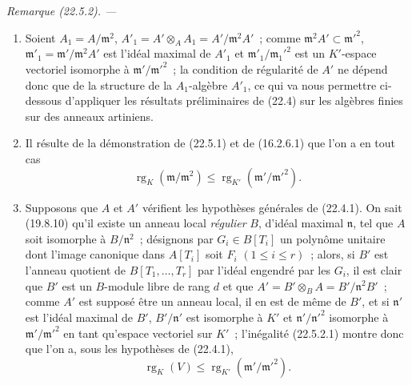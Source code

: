 \documentclass[10pt,oneside]{book}
\makeatletter
\newcommand{\setmanualcurrentlabel}[1]{\def\@currentlabel{#1}}
\newcommand{\oldpage}[2][]{%
  \setcounter{footnote}{0}%
  \marginpar{\scriptsize\textbf{#1}~|~#2}\ignorespaces}
\newenvironment{remark}[1][]{%
  \setmanualcurrentlabel{#1}\par\medskip\noindent\itshape Remarque (#1). ---\ }{\par}
\makeatother
\begin{document}
\begin{remark}[22.5.2]
\label{0.22.5.2-fr}
\begin{enumerate}
  \item[\rm(i)] Soient $A_1=A/\mathfrak m^2$,
  $A'_1=A'\otimes_AA_1=A'/\mathfrak m^2A'$~; comme
  $\mathfrak m^2A'\subset\mathfrak m'^2$,
  $\mathfrak m'_1=\mathfrak m'/\mathfrak m^2A'$ est l'idéal maximal de $A'_1$
  et $\mathfrak m'_1/\mathfrak m_1'^2$ est un $K'$-espace vectoriel isomorphe
  à $\mathfrak m'/\mathfrak m'^2$~; la condition de régularité de $A'$ ne
  dépend donc que de la structure de la $A_1$-algèbre $A'_1$, ce qui va nous
  permettre ci-dessous d'appliquer les résultats préliminaires de (22.4) sur
  les algèbres finies sur des anneaux artiniens.
  \item[\rm(ii)] Il résulte de la démonstration de (22.5.1) et de (16.2.6.1)
  que l'on a en tout cas
  \begin{equation}
  \label{0.22.5.2.1-fr}
    \operatorname{rg}_K(\mathfrak m/\mathfrak m^2)
    \leqslant\operatorname{rg}_{K'}(\mathfrak m'/\mathfrak m'^2).
    \tag{22.5.2.1}
  \end{equation}

  \oldpage[0\textsubscript{IV-1}]{202}

  \item[\rm(iii)] Supposons que $A$ et $A'$ vérifient les hypothèses générales
  de (22.4.1). On sait (19.8.10) qu'il existe un anneau local \emph{régulier}
  $B$, d'idéal maximal $\mathfrak n$, tel que $A$ soit isomorphe à
  $B/\mathfrak n^2$~; désignons par $G_i\in B[T_i]$ un polynôme unitaire dont
  l'image canonique dans $A[T_i]$ soit $F_i$ $(1\leqslant i\leqslant r)$~;
  alors, si $B'$ est l'anneau quotient de $B[T_1,\ldots,T_r]$ par l'idéal
  engendré par les $G_i$, il est clair que $B'$ est un $B$-module libre de rang
  $d$ et que $A'=B'\otimes_BA=B'/\mathfrak n^2B'$~; comme $A'$ est supposé être
  un anneau local, il en est de même de $B'$, et si $\mathfrak n'$ est l'idéal
  maximal de $B'$, $B'/\mathfrak n'$ est isomorphe à $K'$ et
  $\mathfrak n'/\mathfrak n'^2$ isomorphe à $\mathfrak m'/\mathfrak m'^2$ en
  tant qu'espace vectoriel sur $K'$~; l'inégalité (22.5.2.1) montre donc que
  l'on a, sous les hypothèses de (22.4.1),
  \begin{equation}
  \label{0.22.5.2.2-fr}
    \operatorname{rg}_K(V)\leqslant\operatorname{rg}_{K'}(\mathfrak m'/\mathfrak m'^2).
    \tag{22.5.2.2}
  \end{equation}
\end{enumerate}
\end{remark}
\end{document}
